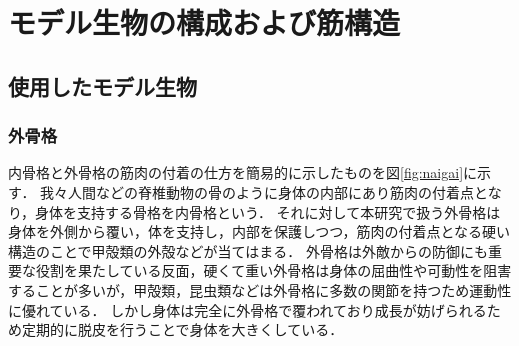 \newpage
\section{モデル生物の構成および筋構造}
\subsection{使用したモデル生物}
\subsubsection{外骨格}
内骨格と外骨格の筋肉の付着の仕方を簡易的に示したものを図\ref{fig:naigai}に示す．
我々人間などの脊椎動物の骨のように身体の内部にあり筋肉の付着点となり，身体を支持する骨格を内骨格という．
それに対して本研究で扱う外骨格は身体を外側から覆い，体を支持し，内部を保護しつつ，筋肉の付着点となる硬い構造のことで甲殻類の外殻などが当てはまる．
外骨格は外敵からの防御にも重要な役割を果たしている反面，硬くて重い外骨格は身体の屈曲性や可動性を阻害することが多いが，甲殻類，昆虫類などは外骨格に多数の関節を持つため運動性に優れている．
しかし身体は完全に外骨格で覆われており成長が妨げられるため定期的に脱皮を行うことで身体を大きくしている．
